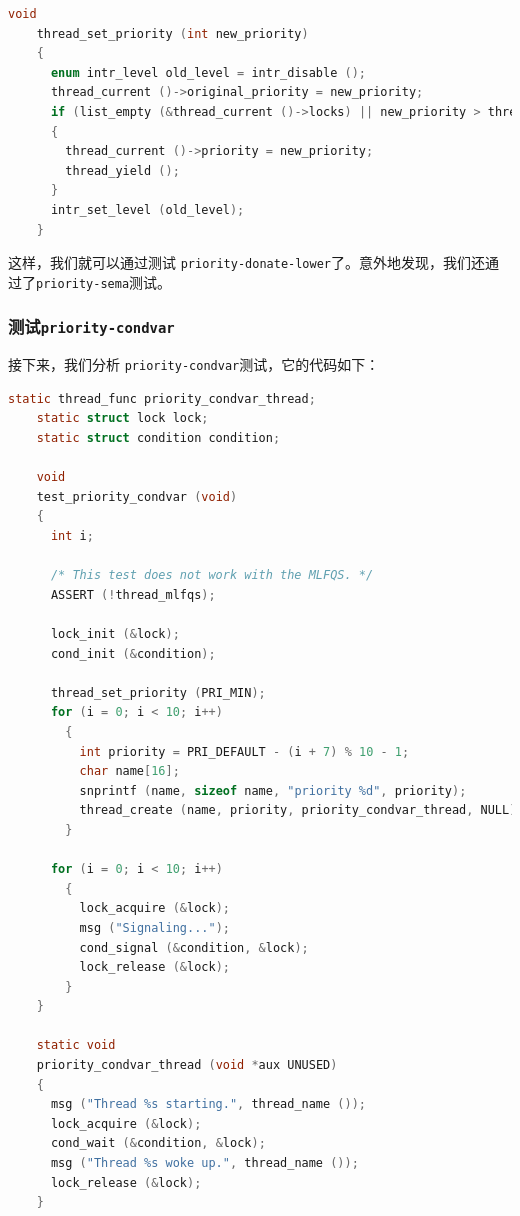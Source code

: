 \documentclass{article}
\begin{document}
\begin{lstlisting}[language=C, title=修改后的\texttt{thread\_set\_priority()}函数]
    void
    thread_set_priority (int new_priority) 
    {
      enum intr_level old_level = intr_disable ();
      thread_current ()->original_priority = new_priority;
      if (list_empty (&thread_current ()->locks) || new_priority > thread_current ()->priority)
      {
        thread_current ()->priority = new_priority;
        thread_yield ();
      }
      intr_set_level (old_level);
    }
\end{lstlisting}

这样，我们就可以通过测试 \texttt{priority-donate-lower}了。意外地发现，我们还通过了\texttt{priority-sema}测试。

\subsubsection{测试\texttt{priority-condvar}}

接下来，我们分析 \texttt{priority-condvar}测试，它的代码如下：

\begin{lstlisting}[language=C, title=\texttt{priority-condvar}测试]
    static thread_func priority_condvar_thread;
    static struct lock lock;
    static struct condition condition;
    
    void
    test_priority_condvar (void) 
    {
      int i;
      
      /* This test does not work with the MLFQS. */
      ASSERT (!thread_mlfqs);
    
      lock_init (&lock);
      cond_init (&condition);
    
      thread_set_priority (PRI_MIN);
      for (i = 0; i < 10; i++) 
        {
          int priority = PRI_DEFAULT - (i + 7) % 10 - 1;
          char name[16];
          snprintf (name, sizeof name, "priority %d", priority);
          thread_create (name, priority, priority_condvar_thread, NULL);
        }
    
      for (i = 0; i < 10; i++) 
        {
          lock_acquire (&lock);
          msg ("Signaling...");
          cond_signal (&condition, &lock);
          lock_release (&lock);
        }
    }
    
    static void
    priority_condvar_thread (void *aux UNUSED) 
    {
      msg ("Thread %s starting.", thread_name ());
      lock_acquire (&lock);
      cond_wait (&condition, &lock);
      msg ("Thread %s woke up.", thread_name ());
      lock_release (&lock);
    }

\end{lstlisting}
\end{document}
